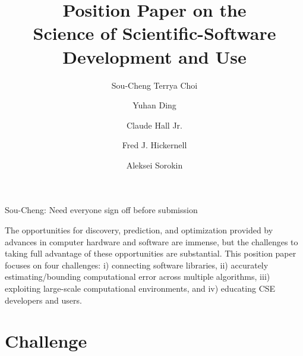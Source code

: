 \documentclass{amsart}
\newcommand{\SCTCNote}[1]{{\color{green}Sou-Cheng: #1}}
\begin{document}
\title{Position Paper on the \\ Science of Scientific-Software Development and Use}
\author{\vspace{-2ex}Sou-Cheng Terrya Choi}
\address[Choi, Ding, Hickernell, Sorokin]{Department of Applied Mathematics, RE 220, 10 W. 32nd St., Chicago, IL 60616}
\author{Yuhan Ding}
\author{Claude Hall Jr.}
\address[Hall]{Birmingham Southern College, 900 Arkadelpha Rd, Birmingham, AL, 35254}
\author{Fred J. Hickernell}
\author{Aleksei Sorokin}

\SCTCNote{Need everyone sign off before submission}


\maketitle

\vspace{-5ex}

The opportunities for discovery, prediction, and optimization provided by advances in computer hardware and software are immense, but the challenges to taking full advantage of these opportunities are substantial.  
This position paper focuses on four challenges: i) connecting software libraries, ii) accurately estimating/bounding computational error across multiple algorithms, iii) exploiting large-scale computational environments, and iv) educating CSE developers and users.


\section{Challenge} %
\end{document}
